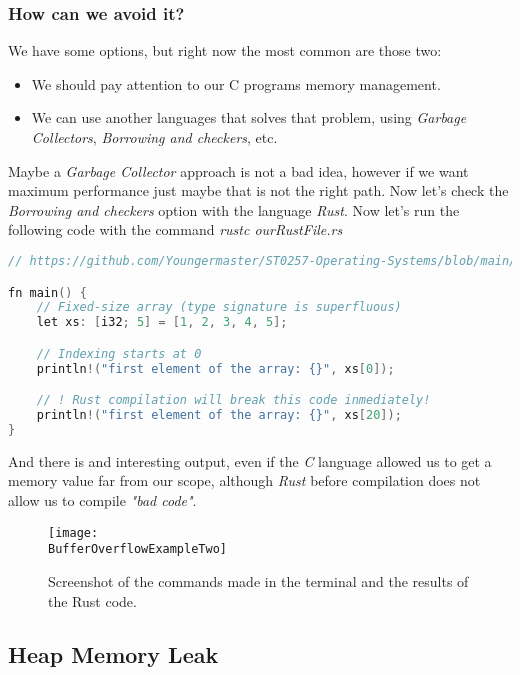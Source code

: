 \subsubsection{How can we avoid it?}

We have some options, but right now the most common are those two:

\begin{itemize}
    \item We should pay attention to our C programs memory management.
    \item We can use another languages that solves that problem, using \textit{Garbage Collectors},
    \textit{Borrowing and checkers}, etc.
\end{itemize}

Maybe a \textit{Garbage Collector} approach is not a bad idea, however if we want maximum
performance just maybe that is not the right path. Now let's check the \textit{Borrowing and checkers}
option with the language \textit{Rust}. Now let's run the following code with the command
\textit{rustc ourRustFile.rs}


\begin{lstlisting}[language=C++, caption=This file shows an implementation of how Rust handles the
    memory leaks.]
// https://github.com/Youngermaster/ST0257-Operating-Systems/blob/main/Challenges/Challenge_1/BufferOverflow/avoid_memory_leaks.rs

fn main() {
    // Fixed-size array (type signature is superfluous)
    let xs: [i32; 5] = [1, 2, 3, 4, 5];

    // Indexing starts at 0
    println!("first element of the array: {}", xs[0]);

    // ! Rust compilation will break this code inmediately!
    println!("first element of the array: {}", xs[20]);
}
\end{lstlisting}

And there is and interesting output, even if the \textit{C} language allowed us to get a memory
value far from our scope, although \textit{Rust} before compilation does not allow us to compile
\textit{"bad code"}.

\begin{figure}[h]
    \centering
    \texttt{[image: \\BufferOverflowExampleTwo]}
    \caption{Screenshot of the commands made in the terminal and the results of the Rust code.}
\end{figure}

\subsection{Heap Memory Leak}

